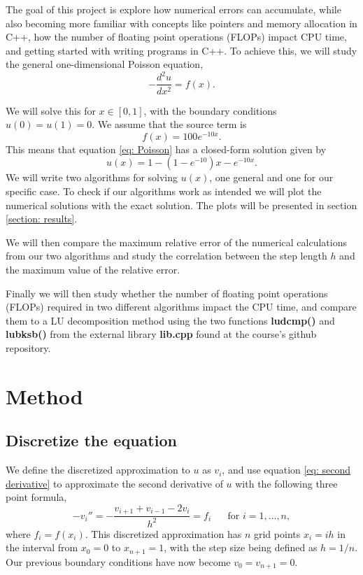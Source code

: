 \documentclass[english, nofootinbib]{revtex4-1}  %
\begin{document}
The goal of this project is explore how numerical errors can accumulate, while also becoming more familiar with concepts like pointers and memory allocation in C++, how the number of floating point operations (FLOPs) impact CPU time, and getting started with writing programs in C++. To achieve this, we will study the general one-dimensional Poisson equation,
\begin{equation} \label{eq: Poisson}
-\frac{d^2 u}{dx^2} = f(x).
\end{equation}

We will solve this for $x \in [0,1]$, with the boundary conditions $u(0)=u(1) = 0$. We assume that the source term is 
\begin{equation} \label{eq: f(x)}
f(x) = 100 e^{-10x}.
\end{equation}
This means that equation \ref{eq: Poisson} has a closed-form solution given by 
\begin{equation}\label{eq: u_analytic}
u(x) = 1-(1-e^{-10})x - e^{-10x}.
\end{equation}
We will write two algorithms for solving $u(x)$, one general and one for our specific case. To check if our algorithms work as intended we will plot the numerical solutions with the exact solution. The plots will be presented in section \ref{section: results}. 

We will then compare the maximum relative error of the numerical calculations from our two algorithms and study the correlation between the step length $h$ and the maximum value of the relative error.

Finally we will then study whether the number of floating point operations (FLOPs) required in two different algorithms impact the CPU time, and compare them to a LU decomposition method using the two functions \textbf{ludcmp()} and \textbf{lubksb()} from the external library \textbf{lib.cpp} found at the course's github repository.\cite{lib} 


\section{Method}


\subsection{Discretize the equation}
We define the discretized approximation to $u$ as $v_i$, and use equation \ref{eq: second derivative} to approximate the second derivative of $u$ with the following three point formula,
\begin{equation} \label{eq:u_discretized}
-v_i'' = -\frac{v_{i+1}+v_{i-1} - 2v_i}{h^2} = f_i \;\;\;\;\;\; \text{for $i = 1, \dots, n$},
\end{equation}
where $f_i = f(x_i)$. This discretized approximation has $n$ grid points $x_i = ih$ in the interval from $x_0 = 0$ to $x_{n+1} = 1$, with the step size being defined as $h = 1/n$. Our previous boundary conditions have now become $v_0 = v_{n+1} = 0$. 
\end{document}
